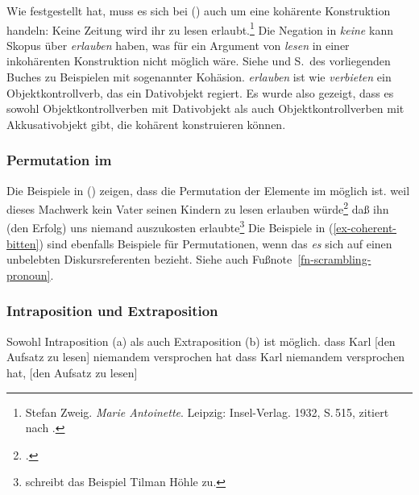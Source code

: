 Wie \citet[]{Askedal88} festgestellt hat, muss es sich bei ()
auch um eine kohärente Konstruktion handeln:
%
%
\ea
Keine Zeitung         wird ihr       zu lesen erlaubt.\footnote{
        Stefan Zweig. \emph{Marie Antoinette}. Leipzig: Insel-Verlag. 1932, S.\,515, 
        zitiert nach .
}
\z
Die Negation in \emph{keine} kann Skopus über \emph{erlauben} haben,
was für ein Argument von \emph{lesen} in einer inkohärenten Konstruktion nicht möglich wäre.
Siehe  und S.\,\pageref{bsp-trauen-kohaerent} des vorliegenden
Buches zu Beispielen mit sogenannter Kohäsion. \emph{erlauben} ist wie \emph{verbieten}
ein Objektkontrollverb, das ein Dativobjekt regiert. Es wurde also gezeigt, dass es sowohl
Objektkontrollverben mit Dativobjekt als auch Objektkontrollverben mit Akkusativobjekt gibt, die
kohärent konstruieren können.


\subsubsection{Permutation im \mf}
\label{sec-obj-contr-perm-mf}

Die Beispiele in () zeigen, dass die Permutation der Elemente im \mf möglich ist.
\eal
\ex{}
weil     dieses Machwerk        kein Vater      seinen Kindern     zu lesen erlauben würde\footnote{
        .
}
\ex 
daß ihn       (den Erfolg) uns      niemand      auszukosten erlaubte\footnote{
        \citet*[]{Haider91} schreibt das Beispiel Tilman Höhle zu.
}
\zl
Die Beispiele in (\ref{ex-coherent-bitten}) sind ebenfalls Beispiele für Permutationen,
wenn das \emph{es} sich auf einen unbelebten Diskursreferenten bezieht. Siehe auch
Fußnote~\ref{fn-scrambling-pronoun}.


\subsubsection{Intraposition und Extraposition}
\label{sec-obj-contr-ie}

Sowohl Intraposition (a) als auch Extraposition (b) ist möglich.
\eal
\ex 
dass Karl [den Aufsatz zu lesen] niemandem versprochen hat
\ex
dass Karl niemandem versprochen hat, [den Aufsatz zu lesen]
\zl
{}

